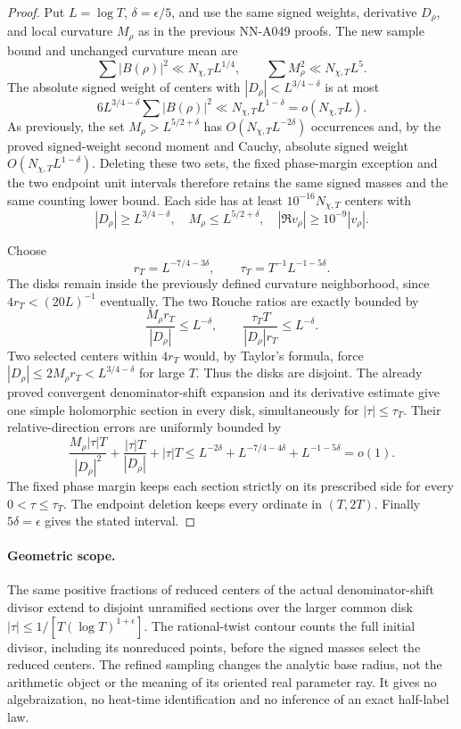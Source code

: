 \begin{proof}
Put \(L=\log T\), \(\delta=\epsilon/5\), and use the same
signed weights, derivative \(D_\rho\), and local curvature
\(M_\rho\) as in the previous NN-A049 proofs.
The new sample bound and unchanged curvature mean are
\[
 \sum|B(\rho)|^2\ll N_{\chi,T}L^{1/4},\qquad
 \sum M_\rho^2\ll N_{\chi,T}L^5.
\]
The absolute signed weight of centers with
\(|D_\rho|<L^{3/4-\delta}\) is at most
\[
                 6L^{3/4-\delta}\sum|B(\rho)|^2
                       \ll N_{\chi,T}L^{1-\delta}
                         =o(N_{\chi,T}L).
\]
As previously, the set \(M_\rho>L^{5/2+\delta}\)
has \(O(N_{\chi,T}L^{-2\delta})\) occurrences and,
by the proved signed-weight second moment and Cauchy,
absolute signed weight \(O(N_{\chi,T}L^{1-\delta})\).
Deleting these two sets, the fixed phase-margin exception
and the two endpoint unit intervals therefore retains
the same signed masses and the same counting lower bound.
Each side has at least \(10^{-16}N_{\chi,T}\) centers with
\[
 |D_\rho|\ge L^{3/4-\delta},\quad
 M_\rho\le L^{5/2+\delta},\quad
 |\Re v_\rho|\ge10^{-9}|v_\rho|.
\]

Choose
\[
 r_T=L^{-7/4-3\delta},\qquad
 \tau_T=T^{-1}L^{-1-5\delta}.
\]
The disks remain inside the previously defined curvature
neighborhood, since \(4r_T<(20L)^{-1}\) eventually.
The two Rouche ratios are exactly bounded by
\[
 \frac{M_\rho r_T}{|D_\rho|}\le L^{-\delta},\qquad
 \frac{\tau_TT}{|D_\rho|r_T}\le L^{-\delta}.
\]
Two selected centers within \(4r_T\) would, by Taylor's
formula, force
\(|D_\rho|\le2M_\rho r_T<L^{3/4-\delta}\) for large \(T\).
Thus the disks are disjoint. The already proved convergent
denominator-shift expansion and its derivative estimate
give one simple holomorphic section in every disk,
simultaneously for \(|\tau|\le\tau_T\).
Their relative-direction errors are uniformly bounded by
\[
 \frac{M_\rho|\tau|T}{|D_\rho|^2}
       +\frac{|\tau|T}{|D_\rho|}+|\tau|T
   \le L^{-2\delta}+L^{-7/4-4\delta}+L^{-1-5\delta}=o(1).
\]
The fixed phase margin keeps each section strictly on its
prescribed side for every \(0<\tau\le\tau_T\).
The endpoint deletion keeps every ordinate in \((T,2T)\).
Finally \(5\delta=\epsilon\) gives the stated interval.
\end{proof}

\paragraph{Geometric scope.}
The same positive fractions of reduced centers of the actual
denominator-shift divisor extend to disjoint unramified
sections over the larger common disk
\(|\tau|\le1/[T(\log T)^{1+\epsilon}]\).
The rational-twist contour counts the full initial divisor,
including its nonreduced points, before the signed masses
select the reduced centers. The refined sampling changes
the analytic base radius, not the arithmetic object or the
meaning of its oriented real parameter ray.
It gives no algebraization, no heat-time identification and
no inference of an exact half-label law.


